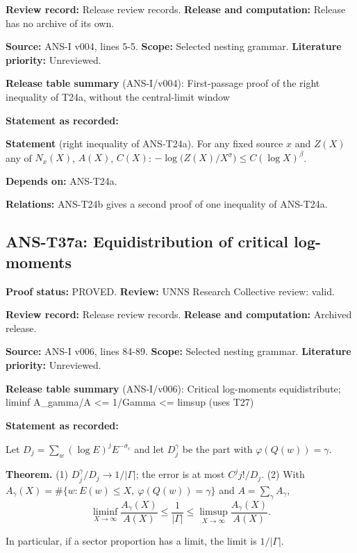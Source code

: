 \documentclass[
  11pt,
]{article}
\begin{document}
\textbf{Review record:} Release review records. \textbf{Release and
computation:} Release has no archive of its own.

\textbf{Source:} ANS-I v004, lines 5-5. \textbf{Scope:} Selected nesting
grammar. \textbf{Literature priority:} Unreviewed.

\textbf{Release table summary} (ANS-I/v004): First-passage proof of the
right inequality of T24a, without the central-limit window

\textbf{Statement as recorded:}

\textbf{Statement} (right inequality of ANS-T24a). For any fixed source
\(x\) and \(Z(X)\) any of \(N_x(X)\), \(A(X)\), \(C(X)\):
\(-\log\big(Z(X)/X^\sigma\big)\le C(\log X)^\beta\).

\textbf{Depends on:} ANS-T24a.

\textbf{Relations:} ANS-T24b gives a second proof of one inequality of
ANS-T24a.

\hypertarget{ans-t37a-equidistribution-of-critical-log-moments}{%
\subsection{ANS-T37a: Equidistribution of critical
log-moments}\label{ans-t37a-equidistribution-of-critical-log-moments}}

\textbf{Proof status:} PROVED. \textbf{Review:} UNNS Research Collective
review: valid.

\textbf{Review record:} Release review records. \textbf{Release and
computation:} Archived release.

\textbf{Source:} ANS-I v006, lines 84-89. \textbf{Scope:} Selected
nesting grammar. \textbf{Literature priority:} Unreviewed.

\textbf{Release table summary} (ANS-I/v006): Critical log-moments
equidistribute; liminf A\_gamma/A \textless= 1/\textbar Gamma\textbar{}
\textless= limsup (uses T27)

\textbf{Statement as recorded:}

Let \(D_j=\sum_w(\log E)^jE^{-\sigma_c}\) and let \(D_j^\gamma\) be the
part with \(\varphi(Q(w))=\gamma\).

\textbf{Theorem.} (1) \(D_j^\gamma/D_j\to1/|\Gamma|\); the error is at
most \(C^j j!/D_j\). (2) With
\(A_\gamma(X)=\#\{w:E(w)\le X,\ \varphi(Q(w))=\gamma\}\) and
\(A=\sum_\gamma A_\gamma\),
\[\liminf_{X\to\infty}\frac{A_\gamma(X)}{A(X)}\le\frac1{|\Gamma|}\le\limsup_{X\to\infty}\frac{A_\gamma(X)}{A(X)} .\]

In particular, if a sector proportion has a limit, the limit is
\(1/|\Gamma|\).
\end{document}
